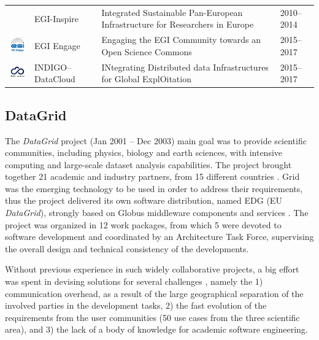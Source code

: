 \documentclass[journal]{IEEEtran}
\begin{document}
\begin{table}[!h]
\begin{tabular}{p{1.6cm}p{1.5cm}p{3cm}l}
\begin{minipage}{.3\textwidth}
\end{minipage}
     & EGI-Inspire &
Integrated Sustainable Pan-European Infrastructure for Researchers in Europe
 & 2010--2014\\
\begin{minipage}{.3\textwidth}
\includegraphics[width=15mm,height=7.5mm]{images/egi_engage}
\end{minipage}
     & EGI Engage &
Engaging the EGI Community towards an Open Science Commons
 & 2015--2017\\
\begin{minipage}{.3\textwidth}
\includegraphics[width=15mm,height=7.5mm]{images/indigo}
\end{minipage}
     & INDIGO--DataCloud &
INtegrating Distributed data Infrastructures for Global ExplOitation
 & 2015--2017\\
\hline
\hline
\end{tabular}
\end{table}

\subsection{DataGrid}

The {\sl DataGrid} \cite{cordis:datagrid} project (Jan 2001 -- Dec 2003)
main goal was to provide scientific communities, including physics, biology and
earth sciences, with intensive computing and large-scale dataset analysis capabilities.
The project brought together 21 academic and industry partners, from 15 different countries \cite{gagliardi}.
Grid was the emerging technology to be used in order to address their requirements,
thus the project delivered its own software distribution, named EDG (EU {\sl DataGrid}), strongly
based on Globus middleware components and services \cite{globus}. The project was organized in 12 work packages, from
which 5 were devoted to software development and coordinated by an
Architecture Task Force, supervising the overall design and technical consistency
of the developments.

Without previous experience in such widely
collaborative projects, a big effort was spent in devising solutions for several
challenges \cite{datagrid}, namely the 1) communication overhead, as a
result of the large geographical separation of the involved parties in the
development tasks, 2) the fast evolution of the requirements from the user
communities (50 use cases from the three scientific area), and 3) the lack of a body
of knowledge for academic software engineering.
\end{document}

